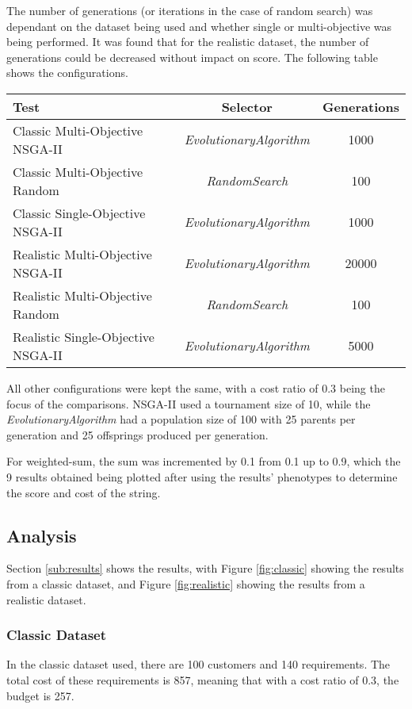 \documentclass[11pt, a4paper]{article}
\begin{document}
The number of generations (or iterations in the case of random search) was
dependant on the dataset being used and whether single or multi-objective was
being performed. It was found that for the realistic dataset, the number of
generations could be decreased without impact on score. The following table
shows the configurations.

\begin{center}
\begin{tabular}{| l | c | c |}
\hline
Test & Selector & Generations \\
\hline
Classic Multi-Objective NSGA-II & \emph{EvolutionaryAlgorithm} & 1000 \\
Classic Multi-Objective Random & \emph{RandomSearch} & 100 \\
Classic Single-Objective NSGA-II & \emph{EvolutionaryAlgorithm} & 1000 \\
Realistic Multi-Objective NSGA-II & \emph{EvolutionaryAlgorithm} & 20000 \\
Realistic Multi-Objective Random & \emph{RandomSearch} & 100 \\
Realistic Single-Objective NSGA-II & \emph{EvolutionaryAlgorithm} & 5000 \\
\hline
\end{tabular}    
\end{center}

All other configurations were kept the same, with a cost ratio of 0.3 being the
focus of the comparisons. NSGA-II used a tournament size of 10, while the
\emph{EvolutionaryAlgorithm} had a population size of 100 with 25 parents per
generation and 25 offsprings produced per generation.

For weighted-sum, the sum was incremented by 0.1 from 0.1 up to 0.9, which the
9 results obtained being plotted after using the results' phenotypes to
determine the score and cost of the string.

\subsection{Analysis} %
\label{sub:analysis}
Section \ref{sub:results} shows the results, with Figure \ref{fig:classic}
showing the results from a classic dataset, and Figure \ref{fig:realistic} 
showing the results from a realistic dataset.

\subsubsection{Classic Dataset} %
\label{ssub:classic_dataset}
In the classic dataset used, there are 100 customers and 140 requirements. The
total cost of these requirements is 857, meaning that with a cost ratio of 0.3,
the budget is 257.
\end{document}
